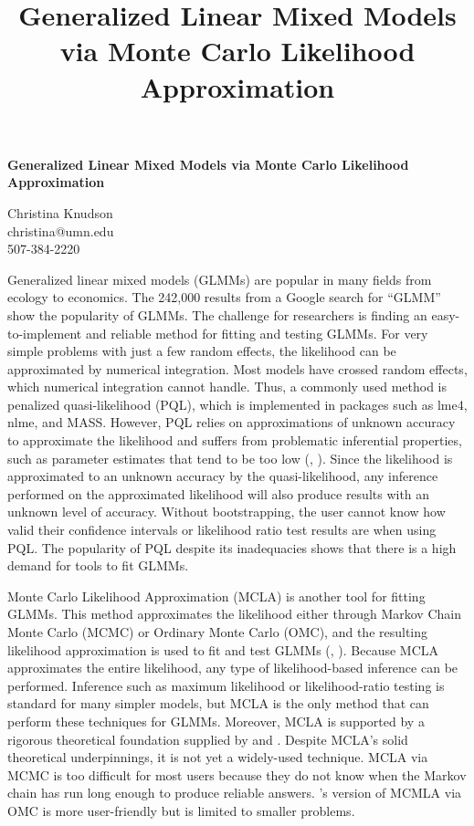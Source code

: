 \documentclass[12pt]{article}
\title{Generalized Linear Mixed Models via Monte Carlo Likelihood Approximation}
\author{}
\date{}
\newcommand{\pcite}[1]{\citeauthor{#1}'s \citeyearpar{#1}}
\newcommand{\ncite}[1]{\citeauthor{#1}, \citeyear{#1}}
\begin{document}
 \centerline{\large \bf Generalized Linear Mixed Models via Monte Carlo Likelihood Approximation} %

 \medskip

 \centerline{Christina Knudson\\
christina@umn.edu\\
507-384-2220}
 \smallskip
{}

Generalized linear mixed models (GLMMs) are popular in many fields from ecology to economics. The 242,000 results from a Google search for ``GLMM'' show the popularity of GLMMs.  The challenge for researchers is finding an easy-to-implement and reliable method for fitting and testing GLMMs. For very simple problems with just a few random effects, the likelihood can be approximated by numerical integration.  Most models have crossed random effects, which numerical integration cannot handle. Thus, a commonly used method is penalized quasi-likelihood (PQL), which is  implemented in packages such as lme4, nlme, and MASS. However, PQL relies on approximations of unknown accuracy to approximate the likelihood and suffers from problematic inferential properties, such as parameter estimates that tend to be too low (\ncite{mccu:sear:2001}). Since the likelihood is approximated to an unknown accuracy by the quasi-likelihood, any inference performed on the approximated likelihood will also produce results with an unknown level of accuracy.  Without bootstrapping, the user cannot know how valid their confidence intervals or likelihood ratio test results are when using PQL.  The popularity of PQL despite its inadequacies shows that there is a high demand for tools to fit GLMMs.


Monte Carlo  Likelihood Approximation (MCLA) is another tool for fitting GLMMs. This method approximates the likelihood either through Markov Chain Monte Carlo (MCMC) or Ordinary Monte Carlo (OMC), and the resulting likelihood approximation is used to fit and test GLMMs (\ncite{geyer:thom:1992}).   Because MCLA approximates the entire likelihood, any type of likelihood-based inference can be performed.  Inference such as maximum likelihood or likelihood-ratio testing is standard for many simpler models, but MCLA is the only method that can perform these techniques for GLMMs.  Moreover, MCLA is supported by a rigorous theoretical foundation supplied by \citet{geyer:1994} and  \citet{sung:geyer:2007}. Despite MCLA's solid theoretical underpinnings, it is not yet a widely-used technique. MCLA via MCMC is  too difficult for most users because they do not know when the Markov chain has run long enough to produce reliable answers.  \pcite{sung:geyer:2007} version of MCMLA via OMC is more user-friendly but is limited to smaller problems.
\end{document}
